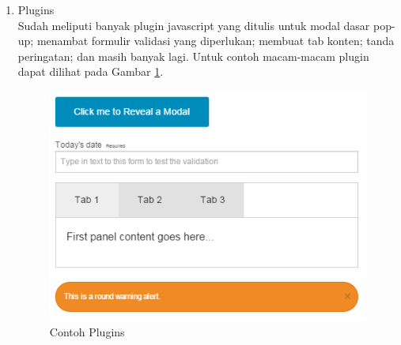 \begin{enumerate}
\item Plugins\\
Sudah meliputi banyak plugin javascript yang ditulis untuk modal dasar pop-up; menambat formulir validasi yang diperlukan; membuat tab konten; tanda peringatan; dan masih banyak lagi. Untuk contoh macam-macam plugin dapat dilihat pada Gambar \ref{fig:plugin}.

\begin{figure}[H]
\centering
\includegraphics[scale=1]{Gambar/plugin.png}
\caption[Gambar Contoh Plugins]{Contoh Plugins}
\label{fig:plugin}
\end{figure}

\end{enumerate}